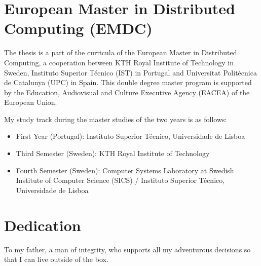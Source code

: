 \cleardoublepage


\chapter*{European Master in Distributed Computing (EMDC)}
\thispagestyle{empty}
The thesis is a part of the curricula of the European Master in Distributed Computing, a cooperation between KTH Royal Institute of Technology in Sweden, Instituto Superior Técnico (IST) in Portugal and Universitat Politècnica de Catalunya (UPC) in Spain. This double degree master program is supported by the Education, Audiovisual and Culture Executive Agency (EACEA) of the European Union.

\noindent My study track during the master studies of the two years is as follows:
\begin{itemize}[noitemsep]
	\item First Year (Portugal): Instituto Superior Técnico, Universidade de Lisboa
	\item Third Semester (Sweden): KTH Royal Institute of Technology
	\item Fourth Semester (Sweden): Computer Systems Laboratory at Swedish Institute of Computer Science (SICS) / Instituto Superior Técnico, Universidade de Lisboa
\end{itemize}


\chapter*{Dedication}
\thispagestyle{empty}

\vfill
\mbox{}
\vfill\Large
\begin{flushright}
  \begin{minipage}{8cm}
    \begin{center}
	To my father, a man of integrity, who supports all my adventurous decisions so that I can live outside of the box.

    \end{center}
  \end{minipage}
\end{flushright}
\normalsize\vfill

\cleardoublepage



